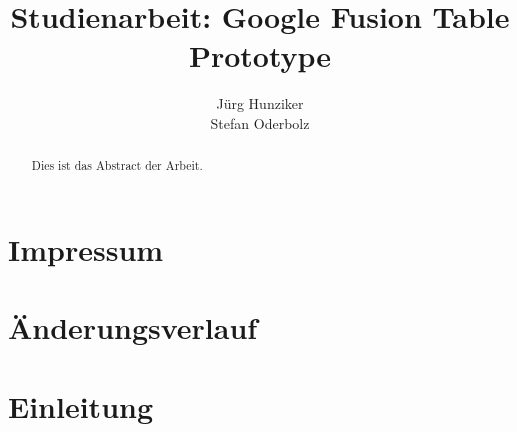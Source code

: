 

\title{Studienarbeit: Google Fusion Table Prototype}
\author{Jürg Hunziker\\
		Stefan Oderbolz}

\date{}



\maketitle

\chapter{Impressum}
\label{chp:impressum}


\chapter{Änderungsverlauf}
\label{chp:aenderungsverlauf}


\begin{abstract}
Dies ist das Abstract der Arbeit.
\end{abstract}

\tableofcontents

\chapter{Einleitung}
\label{chp:einleitung}


